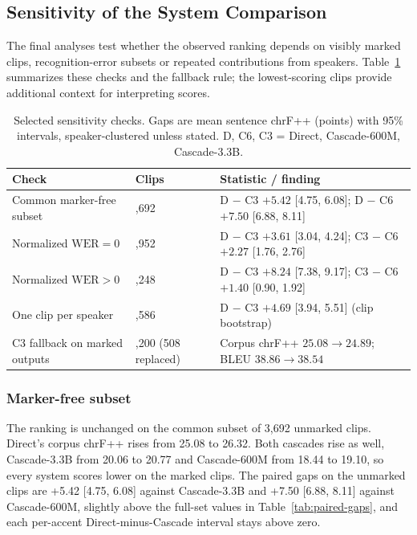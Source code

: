 \subsection{Sensitivity of the System Comparison}
\label{sec:synthesis-results}

The final analyses test whether the observed ranking depends on visibly marked
clips, recognition-error subsets or repeated contributions from speakers.
Table~\ref{tab:sensitivity} summarizes these checks and the fallback rule;
the lowest-scoring clips provide additional context for interpreting scores.

\begin{table}[t]
\caption{Selected sensitivity checks. Gaps are mean sentence chrF++ (points) with 95\% intervals, speaker-clustered unless stated. D, C6, C3 = Direct, Cascade-600M, Cascade-3.3B.}
\label{tab:sensitivity}
\centering
\footnotesize
\setlength{\tabcolsep}{3pt}
\begin{tabularx}{\columnwidth}{@{}>{\raggedright\arraybackslash}p{}
  >{\raggedright\arraybackslash}p{}
  >{\raggedright\arraybackslash}X@{}}
\toprule
Check & Clips & Statistic / finding \\
\midrule
Common marker-free subset & 3,692 &
  D $-$ C3 $+5.42$ [4.75, 6.08];\newline
  D $-$ C6 $+7.50$ [6.88, 8.11] \\
\addlinespace[2pt]
Normalized $\mathrm{WER}=0$ & 2,952 &
  D $-$ C3 $+3.61$ [3.04, 4.24];\newline
  C3 $-$ C6 $+2.27$ [1.76, 2.76] \\
\addlinespace[2pt]
Normalized $\mathrm{WER}>0$ & 1,248 &
  D $-$ C3 $+8.24$ [7.38, 9.17];\newline
  C3 $-$ C6 $+1.40$ [0.90, 1.92] \\
\addlinespace[2pt]
One clip per speaker & 1,586 &
  D $-$ C3 $+4.69$ [3.94, 5.51] (clip bootstrap) \\
\addlinespace[2pt]
C3 fallback on marked outputs & 4,200 (508 replaced) &
  Corpus chrF++ $25.08 \rightarrow 24.89$; BLEU $38.86 \rightarrow 38.54$ \\
\bottomrule
\end{tabularx}
\end{table}

\subsubsection{Marker-free subset}
The ranking is unchanged on the common subset of 3,692 unmarked clips.
Direct's corpus chrF++ rises from 25.08 to
26.32. Both cascades rise as well, Cascade-3.3B from 20.06 to 20.77 and
Cascade-600M from 18.44 to 19.10, so every system scores lower on the marked
clips. The paired gaps on the unmarked clips are +5.42 [4.75, 6.08] against
Cascade-3.3B and +7.50 [6.88, 8.11] against Cascade-600M, slightly above the
full-set values in Table~\ref{tab:paired-gaps}, and each per-accent
Direct-minus-Cascade interval stays above zero.

